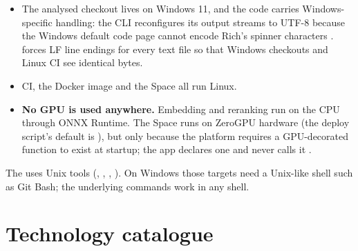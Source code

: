 \begin{itemize}
  \item The analysed checkout lives on Windows 11, and the code carries Windows-specific handling: the CLI reconfigures its output streams to UTF-8 because the Windows default code page cannot encode Rich's spinner characters .  forces LF line endings for every text file so that Windows checkouts and Linux CI see identical bytes.
  \item CI, the Docker image and the Space all run Linux.
  \item \textbf{No GPU is used anywhere.} Embedding and reranking run on the CPU through ONNX Runtime. The Space runs on ZeroGPU hardware (the deploy script's default is ), but only because the platform requires a GPU-decorated function to exist at startup; the app declares one and never calls it .
\end{itemize}

\begin{inferred}
The  uses Unix tools (, , , ). On Windows those targets need a Unix-like shell such as Git Bash; the underlying  commands work in any shell.
\end{inferred}

\section{Technology catalogue}
\label{sec:tech-catalogue}

